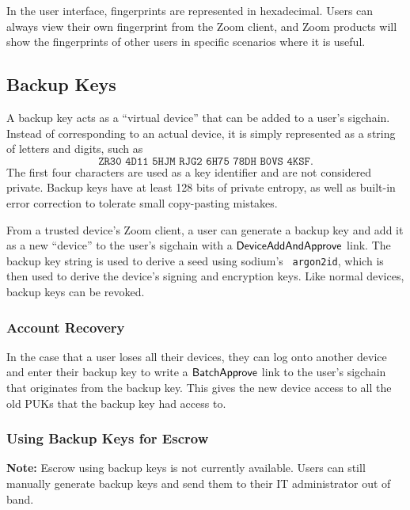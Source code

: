 In the user interface, fingerprints are represented in hexadecimal. Users can always view their own
fingerprint from the Zoom client, and Zoom products will show the fingerprints of other users in
specific scenarios where it is useful.

\subsection{Backup Keys}
\label{subsec:backupkeys}

A backup key acts as a ``virtual device'' that can be added to a user's sigchain. Instead of
corresponding to an actual device, it is simply represented as a string of letters and digits, such
as
\[ \texttt{ZR30 4D11 5HJM RJG2 6H75 78DH B0VS 4KSF}. \] The first four characters are used as a key
identifier and are not considered private. Backup keys have at least 128 bits of private entropy, as
well as built-in error correction to tolerate small copy-pasting mistakes.

From a trusted device's Zoom client, a user can generate a backup key and add it as a new ``device''
to the user's sigchain with a $\mathsf{DeviceAddAndApprove}{}$ link. The backup key string is used to derive
a seed using sodium{}'s~\cite{libsodium} \texttt{argon2id}, which is then used to derive the
device's signing and encryption keys. Like normal devices, backup keys can be revoked.


\subsubsection{Account Recovery}

In the case that a user loses all their devices, they can log onto another device and enter their
backup key to write a $\mathsf{BatchApprove}{}$ link to the user's sigchain that originates from the backup
key. This gives the new device access to all the old PUKs that the backup key had access to.

\subsubsection{Using Backup Keys for Escrow}\label{subsec:backupkeyescrow}

\textbf{Note:} Escrow using backup keys is not currently available. Users can still
manually generate backup keys and send them to their IT administrator out of band.

